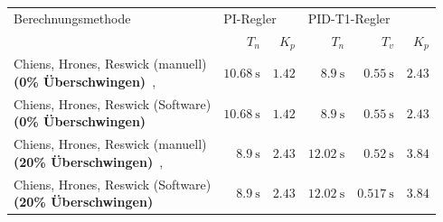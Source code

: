 \begin{longtable}{p{85mm}rrrrr}
    \toprule


    Berechnungsmethode
    &
    \multicolumn{2}{l}{PI-Regler}
    &
    \multicolumn{2}{l}{PID-T1-Regler}
    \\

    &
    $T_n$
    &
    $K_p$
    &
    $T_n$
    &
    $T_v$
    &
    $K_p$
    \\

    \midrule

    \endhead
    \endfoot
    \endlastfoot


    \pbox{84mm}{Chiens, Hrones, Reswick (manuell) \\ \small{\textbf{(0\% \"Uberschwingen)}}~\cite{ref:chiens_tsn},~\cite{ref:chiens_wiki}}
    &
    $\SI{10.68}{\second}$
    &
    $1.42$
    &
    $\SI{8.9}{\second}$
    &
    $\SI{0.55}{\second}$
    &
    $2.43$
    \\

    \addlinespace[0.5em]

    \pbox{84mm}{Chiens, Hrones, Reswick (Software) \\ \small{\textbf{(0\% \"Uberschwingen)}}}
    &
    $\SI{10.68}{\second}$
    &
    $1.42$
    &
    $\SI{8.9}{\second}$
    &
    $\SI{0.55}{\second}$
    &
    $2.43$
    \\

    \addlinespace[0.5em]

    \pbox{84mm}{Chiens, Hrones, Reswick (manuell) \\ \small{\textbf{(20\% \"Uberschwingen)}}~\cite{ref:chiens_tsn},~\cite{ref:chiens_wiki}}
    &
    $\SI{8.9}{\second}$
    &
    $2.43$
    &
    $\SI{12.02}{\second}$
    &
    $\SI{0.52}{\second}$
    &
    $3.84$
    \\

    \addlinespace[0.5em]

    \pbox{84mm}{Chiens, Hrones, Reswick (Software) \\ \small{\textbf{(20\% \"Uberschwingen)}}}
    &
    $\SI{8.9}{\second}$
    &
    $2.43$
    &
    $\SI{12.02}{\second}$
    &
    $\SI{0.517}{\second}$
    &
    $3.84$
    \\


\end{longtable}
